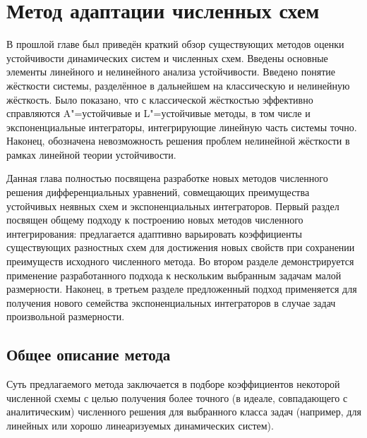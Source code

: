 \chapter{Метод адаптации численных схем}
\label{chapter:methods} 

В прошлой главе был приведён краткий обзор существующих методов оценки устойчивости динамических систем и численных схем.
Введены основные элементы линейного и нелинейного анализа устойчивости.
Введено понятие жёсткости системы, разделённое в дальнейшем на классическую и нелинейную жёсткость.
Было показано, что с классической жёсткостью эффективно справляются A"=устойчивые и L"=устойчивые методы,
в том числе и экспоненциальные интеграторы, интегрирующие линейную часть системы точно.
Наконец, обозначена невозможность решения проблем нелинейной жёсткости в рамках линейной теории устойчивости.

Данная глава полностью посвящена разработке новых методов численного решения дифференциальных уравнений,
совмещающих преимущества устойчивых неявных схем и экспоненциальных интеграторов.
Первый раздел посвящен общему подходу к построению новых методов численного интегрирования:
предлагается адаптивно варьировать коэффициенты существующих разностных схем
для достижения новых свойств при сохранении преимуществ исходного численного метода.
Во втором разделе демонстрируется применение разработанного подхода к нескольким выбранным задачам малой размерности.
Наконец, в третьем разделе предложенный подход применяется для получения нового семейства
экспоненциальных интеграторов в случае задач произвольной размерности.


\section{Общее описание метода}
\label{section:methods:description}

Суть предлагаемого метода заключается в подборе коэффициентов некоторой численной схемы
с целью получения более точного (в идеале, совпадающего с аналитическим) численного решения
для выбранного класса задач (например, для линейных или хорошо линеаризуемых динамических систем).

